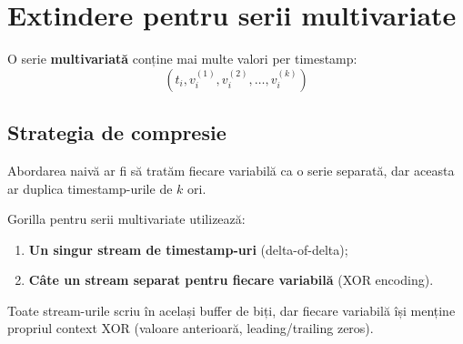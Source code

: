 \section{Extindere pentru serii multivariate}

O serie \textbf{multivariată} conține mai multe valori per timestamp:
\begin{equation}
    (t_i, v_i^{(1)}, v_i^{(2)}, \ldots, v_i^{(k)})
\end{equation}

\subsection{Strategia de compresie}

Abordarea naivă ar fi să tratăm fiecare variabilă ca o serie separată, dar aceasta ar duplica timestamp-urile de $k$ ori.

Gorilla pentru serii multivariate utilizează:
\begin{enumerate}
    \item \textbf{Un singur stream de timestamp-uri} (delta-of-delta);
    \item \textbf{Câte un stream separat pentru fiecare variabilă} (XOR encoding).
\end{enumerate}

Toate stream-urile scriu în același buffer de biți, dar fiecare variabilă își menține propriul context XOR (valoare anterioară, leading/trailing zeros).